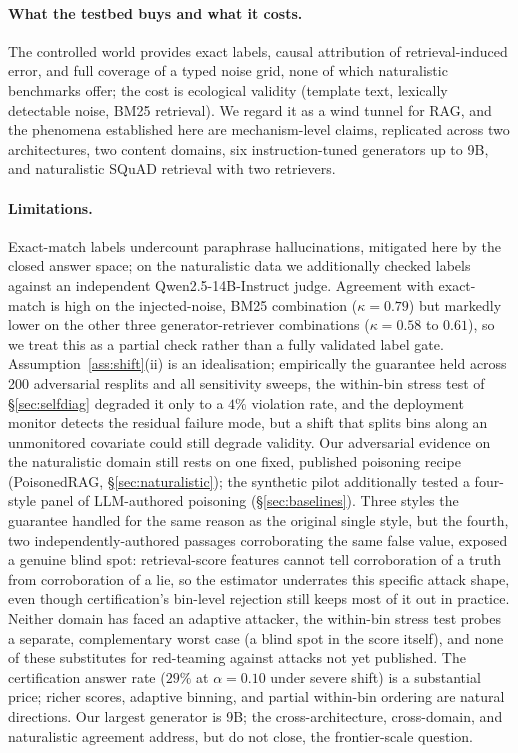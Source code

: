 \documentclass[sn-basic]{sn-jnl}
\theoremstyle{thmstyleone}
\theoremstyle{thmstyletwo}
\begin{document}
\paragraph{What the testbed buys and what it costs.}
The controlled world provides exact labels, causal attribution of
retrieval-induced error, and full coverage of a typed noise grid, none of which
naturalistic benchmarks offer; the cost is ecological validity (template text,
lexically detectable noise, BM25 retrieval). We regard it as a wind tunnel for
RAG, and the phenomena established here are mechanism-level claims, replicated
across two architectures, two content domains, six instruction-tuned generators
up to 9B, and naturalistic SQuAD retrieval with two retrievers.

\paragraph{Limitations.}
Exact-match labels undercount paraphrase hallucinations, mitigated here by the
closed answer space; on the naturalistic data we additionally checked labels
against an independent Qwen2.5-14B-Instruct judge. Agreement with exact-match
is high on the injected-noise, BM25 combination ($\kappa = 0.79$) but markedly
lower on the other three generator-retriever combinations ($\kappa = 0.58$ to
$0.61$), so we treat this as a partial check rather than a fully validated
label gate. Assumption~\ref{ass:shift}(ii) is an
idealisation; empirically the guarantee held across 200 adversarial resplits and
all sensitivity sweeps, the within-bin stress test of \S\ref{sec:selfdiag}
degraded it only to a $4\%$ violation rate, and the deployment monitor detects
the residual failure mode, but a shift that splits bins along an unmonitored
covariate could still degrade validity. Our adversarial evidence on the
naturalistic domain still rests on one fixed, published poisoning recipe
(PoisonedRAG, \S\ref{sec:naturalistic}); the synthetic pilot additionally
tested a four-style panel of LLM-authored poisoning (\S\ref{sec:baselines}).
Three styles the guarantee handled for the same reason as the original
single style, but the fourth, two independently-authored passages
corroborating the same false value, exposed a genuine blind spot:
retrieval-score features cannot tell corroboration of a truth from
corroboration of a lie, so the estimator underrates this specific attack
shape, even though certification's bin-level rejection still keeps most of
it out in practice. Neither domain has faced an adaptive attacker,
the within-bin stress test probes a separate, complementary worst case (a
blind spot in the score itself), and none of these substitutes for
red-teaming against attacks not yet published. The
certification answer rate ($29\%$ at
$\alpha = 0.10$ under severe shift) is a substantial price; richer scores,
adaptive binning, and partial within-bin ordering are natural directions. Our
largest generator is 9B; the cross-architecture, cross-domain, and naturalistic
agreement address, but do not close, the frontier-scale question.
\end{document}
